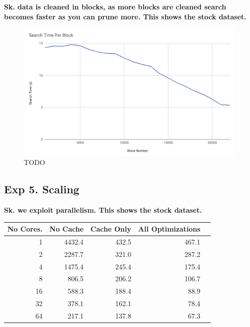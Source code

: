 
\textbf{Sk. data is cleaned in blocks, as more blocks are cleaned search becomes faster as you can prune more. This shows the stock dataset.}

 \begin{figure}[ht]
\centering
 \includegraphics[width=0.9\columnwidth]{figures/draft-blocks.png}
 \caption{TODO
 \label{fig:opt}}
\end{figure}


\subsection*{Exp 5. Scaling}
\textbf{Sk. we exploit parallelism. This shows the stock dataset.}

\begin{table}[ht]
\centering
\label{my-label}
\begin{tabular}{|r|r|r|r|r|}
\hline
No Cores.   & No Cache & Cache Only & All Optimizations \\
\hline
1 & 4432.4 & 432.5 & 467.1 \\ \hline
2 & 2287.7 & 321.0 & 287.2 \\ \hline
4 & 1475.4 & 245.4 & 175.4 \\ \hline
8 & 806.5  & 206.2 & 106.7 \\ \hline
16 & 588.3  & 188.4 & 88.9  \\ \hline
32 & 378.1  & 162.1 & 78.4  \\ \hline
64 & 217.1  & 137.8 & 67.3    \\
\hline
\end{tabular}
\end{table}

